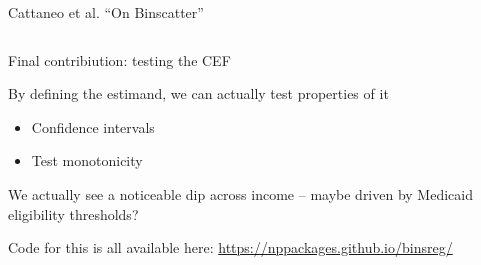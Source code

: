 \documentclass[notes,11pt, aspectratio=169]{beamer}
\newenvironment{wideitemize}{\itemize\addtolength{\itemsep}{10pt}}{\enditemize}
\begin{document}
\begin{frame}{Cattaneo et al. ``On Binscatter''}
  \begin{columns}[T] %
    \begin{column}{.5\textwidth}
      \begin{wideitemize}
      \item Final contribiution: testing the CEF
      \item By defining the estimand, we can actually test properties
        of it
        \begin{itemize}
        \item Confidence intervals
        \item Test monotonicity
        \end{itemize}
      \item We actually see a noticeable dip across income -- maybe
        driven by Medicaid eligibility thresholds?
      \item Code for this is all available here: \url{https://nppackages.github.io/binsreg/}
  \end{wideitemize}
  \end{column}%
  \hfill%
  \begin{column}{.5\textwidth}
\end{column}
\end{columns}
\end{frame}
\end{document}
